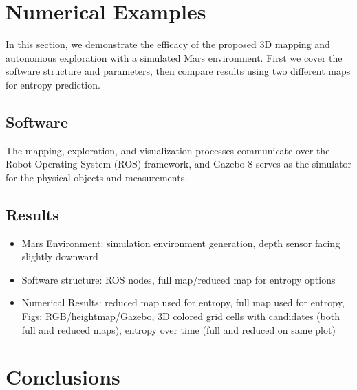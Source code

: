 \documentclass[conf]{new-aiaa}
\begin{document}
\section{Numerical Examples}
\label{sec:NumExamples}

In this section, we demonstrate the efficacy of the proposed 3D mapping and autonomous exploration with a simulated Mars environment. First we cover the software structure and parameters, then compare results using two different maps for entropy prediction.


\subsection{Software}

The mapping, exploration, and visualization processes communicate over the Robot Operating System (ROS) framework, and Gazebo 8 serves as the simulator for the physical objects and measurements.


\subsection{Results}

\begin{itemize}
	\item Mars Environment: simulation environment generation, depth sensor facing slightly downward
	\item Software structure: ROS nodes, full map/reduced map for entropy options
	\item Numerical Results: reduced map used for entropy, full map used for entropy, Figs: RGB/heightmap/Gazebo, 3D colored grid cells with candidates (both full and reduced maps), entropy over time (full and reduced on same plot)
\end{itemize}
  

\section{Conclusions}

\end{document}
